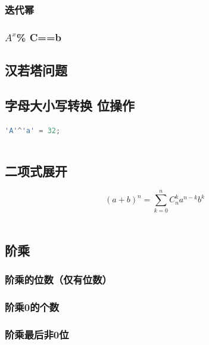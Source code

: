\documentclass[a4paper]{article}
\begin{document}
\begin{CJK*}{UTF8}{gbsn}
\begin{multicols}{3}
\begin{flushleft}
\subsubsection{迭代幂}


\subsubsection{\texorpdfstring{$A^x$}.\% C==b}


\subsection{汉若塔问题}



\subsection{字母大小写转换 位操作}
\begin{lstlisting}[language={c++}]
'A'^'a' = 32; 
\end{lstlisting}

$$$$
\subsection{二项式展开}
$$(a+b)^n = \sum_{k=0}^n C_n^ka^{n-k}b^k$$\\


\subsection{阶乘}

\subsubsection{阶乘的位数（仅有位数）}



\subsubsection{阶乘0的个数}



\subsubsection{阶乘最后非0位}




\end{flushleft}
\end{multicols}
\end{CJK*}
\end{document}
